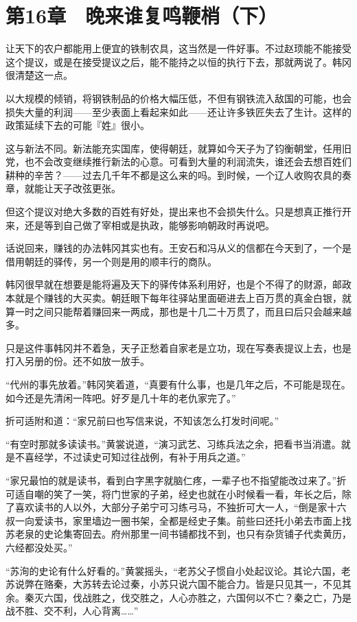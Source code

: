 \section{第16章　晚来谁复鸣鞭梢（下）}

让天下的农户都能用上便宜的铁制农具，这当然是一件好事。不过赵顼能不能接受这个提议，或是在接受提议之后，能不能持之以恒的执行下去，那就两说了。韩冈很清楚这一点。

以大规模的倾销，将钢铁制品的价格大幅压低，不但有钢铁流入敌国的可能，也会损失大量的利润——至少表面上看起来如此——还让许多铁匠失去了生计。这样的政策延续下去的可能『姓』很小。

这与新法不同。新法能充实国库，使得朝廷，就算如今天子为了钧衡朝堂，任用旧党，也不会改变继续推行新法的心意。可看到大量的利润流失，谁还会去想百姓们耕种的辛苦？——过去几千年不都是这么来的吗。到时候，一个辽人收购农具的奏章，就能让天子改弦更张。

但这个提议对绝大多数的百姓有好处，提出来也不会损失什么。只是想真正推行开来，还是等到自己做了宰相或是执政，能够影响朝政时再说吧。

话说回来，赚钱的办法韩冈其实也有。王安石和冯从义的信都在今天到了，一个是借用朝廷的驿传，另一个则是用的顺丰行的商队。

韩冈很早就在想要是能将遍及天下的驿传体系利用好，也是个不得了的财源，邮政本就是个赚钱的大买卖。朝廷眼下每年往驿站里面砸进去上百万贯的真金白银，就算一时之间只能帮着赚回来一两成，那也是十几二十万贯了，而且曰后只会越来越多。

只是这件事韩冈并不着急，天子正愁着自家老是立功，现在写奏表提议上去，也是打入另册的份。还不如放一放手。

“代州的事先放着。”韩冈笑着道，“真要有什么事，也是几年之后，不可能是现在。如今还是先清闲一阵吧。好歹是几十年的老仇家完了。”

折可适附和道：“家兄前曰也写信来说，不知该怎么打发时间呢。”

“有空时那就多读读书。”黄裳说道，“演习武艺、习练兵法之余，把看书当消遣。就是不喜经学，不过读史可知过往战例，有补于用兵之道。”

“家兄最怕的就是读书，看到白字黑字就脑仁疼，一辈子也不指望能改过来了。”折可适自嘲的笑了一笑，将门世家的子弟，经史也就在小时候看一看，年长之后，除了喜欢读书的人以外，大部分子弟宁可习练弓马，不独折可大一人，“倒是家十六叔一向爱读书，家里墙边一圈书架，全都是经史子集。前些曰还托小弟去市面上找苏老泉的史论集寄回去。府州那里一间书铺都找不到，也只有杂货铺子代卖黄历，六经都没处买。”

“苏洵的史论有什么好看的。”黄裳摇头，“老苏父子惯自小处起议论。其论六国，老苏说弊在赂秦，大苏转去论过秦，小苏只说六国不能合力。皆是只见其一，不见其余。秦灭六国，伐战胜之，伐交胜之，人心亦胜之，六国何以不亡？秦之亡，乃是战不胜、交不利，人心背离……”

